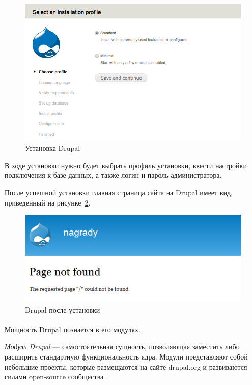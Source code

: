 \begin{figure}[h]
  \centering
  \includegraphics[width=150mm]{pic/drupal_install.png}
  \caption{Установка Drupal}
  \label{fig:drupal_install}
\end{figure}

В ходе установки нужно будет выбрать профиль установки, 
ввести настройки подключения к базе данных, а также логин и пароль администратора.

После успешной установки главная страница сайта на Drupal имеет вид, 
приведенный на рисунке~\ref{fig:drupal_after_install}.

\begin{figure}[h]
  \centering
  \includegraphics[width=150mm]{pic/drupal_after_install.png}
  \caption{Drupal после установки}
  \label{fig:drupal_after_install}
\end{figure}

\paragraph{}
Мощность Drupal познается в его модулях. 

\textit{Модуль Drupal} --- самостоятельная сущность, позволяющая заместить либо
расширить стандартную функциональность ядра. 
Модули представляют собой небольшие проекты, которые размещаются на сайте
drupal.org и развиваются силами open-source сообщества~\cite{drupal_modules}.

